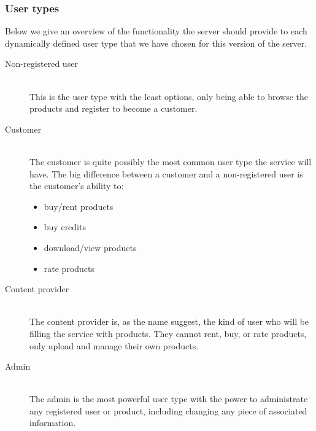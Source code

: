 \subsubsection{User types}
\label{s_actor-goal-list}
Below we give an overview of the functionality the server should provide to each dynamically defined user type that we have chosen for this version of the server.

\begin{description}
	\item [Non-registered user] \hfill \\
		This is the user type with the least options, only being able to browse the products and register to become a customer.
	\item [Customer]  \hfill \\
		The customer is quite possibly the most common user type the service will have. The big difference between a customer and a non-registered user is the customer's ability to:
		\begin{itemize}
			\item buy/rent products
			\item buy credits
			\item download/view products
			\item rate products
		\end{itemize}
	\item [Content provider] \hfill \\
		The content provider is, as the name suggest, the kind of user who will be filling the service with products. They cannot rent, buy, or rate products, only upload and manage their own products.  
	\item [Admin] \hfill \\
		The admin is the most powerful user type with the power to administrate any registered user or product, including changing any piece of associated information.
\end{description}